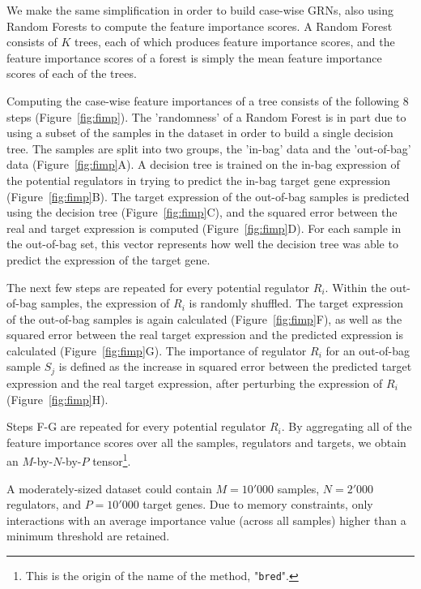 We make the same simplification in order to build case-wise GRNs, also using Random Forests to compute the feature importance scores. A Random Forest consists of $K$ trees, each of which produces feature importance scores, and the feature importance scores of a forest is simply the mean feature importance scores of each of the trees. 

Computing the case-wise feature importances of a tree consists of the following 8 steps (Figure~\ref{fig:fimp}).
The 'randomness' of a Random Forest is in part due to using a subset of the samples in the dataset in order to build a single decision tree. The samples are split into two groups, the 'in-bag' data and the 'out-of-bag' data (Figure~\ref{fig:fimp}A). A decision tree \cite{breiman_classificationregressiontrees_1984} is trained on the in-bag expression of the potential regulators in trying to predict the in-bag target gene expression (Figure~\ref{fig:fimp}B). The target expression of the out-of-bag samples is predicted using the decision tree (Figure~\ref{fig:fimp}C), and the squared error between the real and target expression is computed (Figure~\ref{fig:fimp}D). For each sample in the out-of-bag set, this vector represents how well the decision tree was able to predict the expression of the target gene.

The next few steps are repeated for every potential regulator $R_i$. Within the out-of-bag samples, the expression of $R_i$ is randomly shuffled. The target expression of the out-of-bag samples is again calculated (Figure~\ref{fig:fimp}F), as well as the squared error between the real target expression and the predicted expression is calculated (Figure~\ref{fig:fimp}G). The importance of regulator $R_i$ for an out-of-bag sample $S_j$ is defined as the increase in squared error between the predicted target expression and the real target expression, after perturbing the expression of $R_i$ (Figure~\ref{fig:fimp}H). 

Steps F-G are repeated for every potential regulator $R_i$. By aggregating all of the feature importance scores over all the samples, regulators and targets, we obtain an $M$-by-$N$-by-$P$ tensor\footnote{This is the origin of the name of the method, "\texttt{bred}".}. 

A moderately-sized dataset could contain $M=10'000$ samples, $N=2'000$ regulators, and $P=10'000$ target genes. Due to memory constraints, only interactions with an average importance value (across all samples) higher than a minimum threshold are retained.

